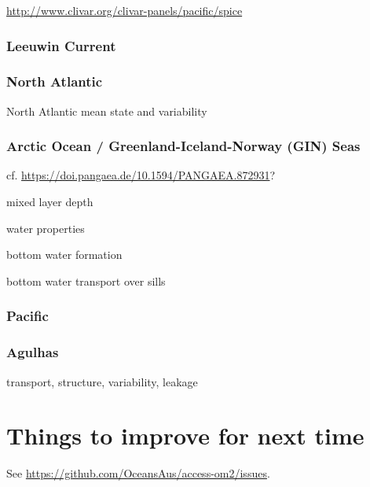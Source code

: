 \documentclass[11pt]{article}
\begin{document}
\url{http://www.clivar.org/clivar-panels/pacific/spice}

\subsubsection{Leeuwin Current}
\citet{WijeratnePattiaratchiProctor2018a}
\citet{FengZhangOkeMonselesanChamberlainMatearSchiller2016a}

\subsubsection{North Atlantic}
North Atlantic mean state \citet{DanabasogluYeagerBaileyBehrensBentsenBiBiastochBoningBozec2014a}
and variability \citet{DanabasogluYeagerKimBehrensBentsenBiBiastochBleckBoning2016a}

\subsubsection{Arctic Ocean / Greenland-Iceland-Norway (GIN) Seas}

cf. \citet{BehrendtSumataRabeSchauer2018a} \url{https://doi.pangaea.de/10.1594/PANGAEA.872931}?

mixed layer depth

water properties

bottom water formation

bottom water transport over sills

\citet{WangIlicakGerdesDrangeAksenovBaileyBentsenBiastochBozec2016b}
\citet{IlicakDrangeWangGerdesAksenovBaileyBentsenBiastochBozec2016a}

\subsubsection{Pacific}
\citet{TsengLinChenThompsonBentsenBoningBozecCassouChassignet2016a}

\subsubsection{Agulhas}
transport, structure, variability, leakage
 
 \newpage
 
\section{Things to improve for next time}
See \url{https://github.com/OceansAus/access-om2/issues}.
\end{document}

